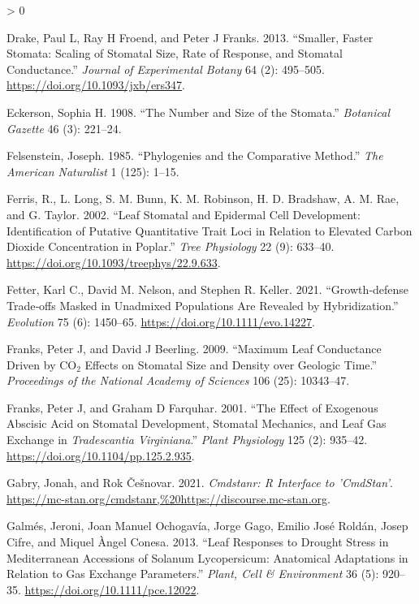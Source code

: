 \documentclass[
  10pt,
]{article}
\newlength{\cslhangindent}
\newenvironment{CSLReferences}[2] %
 {%
  \setlength{\parindent}{0pt}
  \ifodd #1 \everypar{\setlength{\hangindent}{\cslhangindent}}\ignorespaces\fi
  \ifnum #2 > 0
  \setlength{\parskip}{#2\baselineskip}
  \fi
 }%
 {}
\begin{document}
\begin{CSLReferences}{1}{0}
\leavevmode\hypertarget{ref-drake_smaller_2013}{}%
Drake, Paul L, Ray H Froend, and Peter J Franks. 2013. {``Smaller, Faster Stomata: Scaling of Stomatal Size, Rate of Response, and Stomatal Conductance.''} \emph{Journal of Experimental Botany} 64 (2): 495--505. \url{https://doi.org/10.1093/jxb/ers347}.

\leavevmode\hypertarget{ref-eckerson_number_1908}{}%
Eckerson, Sophia H. 1908. {``The Number and Size of the Stomata.''} \emph{Botanical Gazette} 46 (3): 221--24.

\leavevmode\hypertarget{ref-felsenstein_phylogenies_1985}{}%
Felsenstein, Joseph. 1985. {``Phylogenies and the Comparative Method.''} \emph{The American Naturalist} 1 (125): 1--15.

\leavevmode\hypertarget{ref-ferris_leaf_2002}{}%
Ferris, R., L. Long, S. M. Bunn, K. M. Robinson, H. D. Bradshaw, A. M. Rae, and G. Taylor. 2002. {``Leaf Stomatal and Epidermal Cell Development: Identification of Putative Quantitative Trait Loci in Relation to Elevated Carbon Dioxide Concentration in Poplar.''} \emph{Tree Physiology} 22 (9): 633--40. \url{https://doi.org/10.1093/treephys/22.9.633}.

\leavevmode\hypertarget{ref-fetter_growthdefense_2021}{}%
Fetter, Karl C., David M. Nelson, and Stephen R. Keller. 2021. {``Growth‐defense Trade‐offs Masked in Unadmixed Populations Are Revealed by Hybridization.''} \emph{Evolution} 75 (6): 1450--65. \url{https://doi.org/10.1111/evo.14227}.

\leavevmode\hypertarget{ref-franks_maximum_2009}{}%
Franks, Peter J, and David J Beerling. 2009. {``Maximum Leaf Conductance Driven by {CO}\(_{\textrm{2}}\) Effects on Stomatal Size and Density over Geologic Time.''} \emph{Proceedings of the National Academy of Sciences} 106 (25): 10343--47.

\leavevmode\hypertarget{ref-franks_effect_2001}{}%
Franks, Peter J, and Graham D Farquhar. 2001. {``The {Effect} of {Exogenous} {Abscisic} {Acid} on {Stomatal} {Development}, {Stomatal} {Mechanics}, and {Leaf} {Gas} {Exchange} in \emph{{Tradescantia} Virginiana}.''} \emph{Plant Physiology} 125 (2): 935--42. \url{https://doi.org/10.1104/pp.125.2.935}.

\leavevmode\hypertarget{ref-gabry_cmdstanr_2021}{}%
Gabry, Jonah, and Rok Češnovar. 2021. \emph{Cmdstanr: {R} {Interface} to '{CmdStan}'}. \url{https://mc-stan.org/cmdstanr,\%20https://discourse.mc-stan.org}.

\leavevmode\hypertarget{ref-galmes_leaf_2013}{}%
Galmés, Jeroni, Joan Manuel Ochogavía, Jorge Gago, Emilio José Roldán, Josep Cifre, and Miquel Àngel Conesa. 2013. {``Leaf Responses to Drought Stress in {Mediterranean} Accessions of {Solanum} Lycopersicum: Anatomical Adaptations in Relation to Gas Exchange Parameters.''} \emph{Plant, Cell \& Environment} 36 (5): 920--35. \url{https://doi.org/10.1111/pce.12022}.


\end{CSLReferences}
\end{document}
